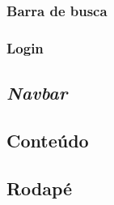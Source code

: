 \subsubsection{Barra de busca}

\subsubsection{Login}
\subsection{\emph{Navbar}}
\subsection{Conteúdo}
\subsection{Rodapé}
